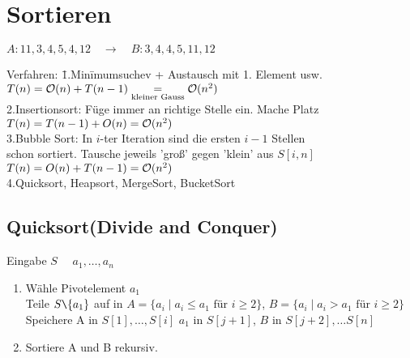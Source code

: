 %
%

\chapter{Sortieren}
    $A: 11,3,4,5,4,12 \quad \rightarrow \quad B:3,4,4,5,11,12$\\
    \begin{tabbing}
        Verfahren: \= 1.Min\=imumsuchev + Austausch mit 1. Element usw. \\
		\> \> $T(n) = \mathcal{O}(n) + T(n-1) \underset{\text{kleiner Gauss}}{=} \mathcal{O}(n^{2})$\\
        \> 2.Insertionsort: Füge immer an richtige Stelle ein. Mache Platz\\
		\> \>  $T(n) = T(n-1) + O(n) = \mathcal{O}(n^{2})$\\
        \> 3.Bubble Sort: In $i$-ter Iteration sind die ersten $i-1$ Stellen \\
		\> schon sortiert. Tausche jeweils 'groß' gegen 'klein' aus $S[i,n]$\\
		\>\>$T(n)= O(n) + T(n-1) = \mathcal{O}(n^{2})$\\
        \> 4.Quicksort, Heapsort, MergeSort, BucketSort
    \end{tabbing}
        

    \section{Quicksort(Divide and Conquer)}
        Eingabe $S$ \ \ $a_1, \ldots , a_n$
        \begin{enumerate}
           \item Wähle Pivotelement $a_1$ \\
           Teile $S \verb=\= \{ a_1 \}$ auf in $A= \{a_i \mid a_i \leq a_1 \text{ für } i \geq 2 \}$, 
           	$B = \{a_i \mid a_i > a_1 \text{ für } i \geq 2 \}$ \\
           Speichere A in $S[1], \ldots, S[i]$ $a_1$ in $S[j+1]$, $B$ in $ S[j+2], \ldots S[n]$ 
           \item Sortiere A und B rekursiv. 
        \end{enumerate}

